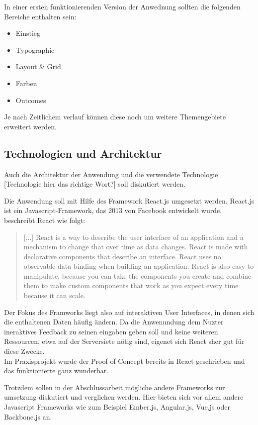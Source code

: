 In einer ersten funktionierenden Version der Anwednung sollten die folgenden Bereiche enthalten sein:

\begin{itemize}
  \item Einstieg
  \item Typographie
  \item Layout \& Grid
  \item Farben
  \item Outcomes
\end{itemize}

Je nach Zeitlichem verlauf können diese noch um weitere Themengebiete erweitert werden.

\subsection{Technologien und Architektur}
Auch die Architektur der Anwendung und die verwendete Technologie [Technologie hier das richtige Wort?] soll diskutiert werden.

Die Anwendung soll mit Hilfe des Framework React.js umgesetzt werden. React.js ist ein Javascript-Framework, das 2013 von Facebook entwickelt wurde. \cite{gackenheimer2015react} beschreibt React wie folgt:

\begin{quote}
[...] React is a way to describe the user interface of an application and a mechanism to change that over time as data changes. React is made with declarative components that describe an interface. React uses no observable data binding when building an application. React is also easy to manipulate, because you can take the components you create and combine them to make custom components that work as you expect every time because it can scale.
\end{quote}

Der Fokus des Framworks liegt also auf interaktiven User Interfaces, in denen sich die enthaltenen Daten häufig ändern. Da die Anwenundung dem Nuzter ineraktives Feedback zu seinen eingaben geben soll und keine weiteren Ressourcen, etwa auf der Serversiete nötig sind, eigenet sich React sher gut für diese Zwecke. \\
Im Praxisprojekt wurde der Proof of Concept bereits in React geschrieben und das funktionierte ganz wunderbar.

Trotzdem sollen in der Abschlussarbeit mögliche andere Frameworks zur umsetzung diskutiert und verglichen werden. Hier bieten sich vor allem andere Javascript Frameworks wie zum Beispiel Ember.js, Angular.js, Vue,js oder Backbone.js an.

